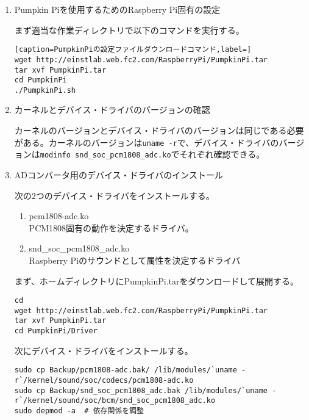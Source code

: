 \begin{enumerate}
\renewcommand{\labelenumi}{(\arabic{enumi})}
\item
  Pumpkin Piを使用するためのRaspberry Pi固有の設定

  まず適当な作業ディレクトリで以下のコマンドを実行する。

\begin{lstlisting}[caption=PumpkinPiの設定ファイルダウンロードコマンド,label=]
wget http://einstlab.web.fc2.com/RaspberryPi/PumpkinPi.tar
tar xvf PumpkinPi.tar
cd PumpkinPi
./PumpkinPi.sh 
\end{lstlisting}
\item
  カーネルとデバイス・ドライバのバージョンの確認

  カーネルのバージョンとデバイス・ドライバのバージョンは同じである必要がある。カーネルのバージョンは\texttt{uname\ -r}で、デバイス・ドライバのバージョンは\texttt{modinfo\ snd\_soc\_pcm1808\_adc.ko}でそれぞれ確認できる。

\item
  ADコンバータ用のデバイス・ドライバのインストール

  次の2つのデバイス・ドライバをインストールする。

  \begin{enumerate}
  \def\labelenumii{\arabic{enumii}.}
  \tightlist
  \item
    pcm1808-adc.ko\\
    PCM1808固有の動作を決定するドライバ。
  \item
    snd\_soc\_pcm1808\_adc.ko\\
    Raspberry Piのサウンドとして属性を決定するドライバ
  \end{enumerate}

  まず、ホームディレクトリにPumpkinPi.tarをダウンロードして展開する。

\begin{lstlisting}[caption=デバイス・ドライバダウンロードコマンド,label=pumpkin_pi_donwload]
cd 
wget http://einstlab.web.fc2.com/RaspberryPi/PumpkinPi.tar
tar xvf PumpkinPi.tar
cd PumpkinPi/Driver
\end{lstlisting}

  次にデバイス・ドライバをインストールする。

\begin{lstlisting}[caption=デバイス・ドライバのインストールコマンド,label=install_device_driver]
sudo cp Backup/pcm1808-adc.bak/ /lib/modules/`uname -r`/kernel/sound/soc/codecs/pcm1808-adc.ko
sudo cp Backup/snd_soc_pcm1808_adc.bak /lib/modules/`uname -r`/kernel/sound/soc/bcm/snd_soc_pcm1808_adc.ko
sudo depmod -a  # 依存関係を調整
\end{lstlisting}


\end{enumerate}
